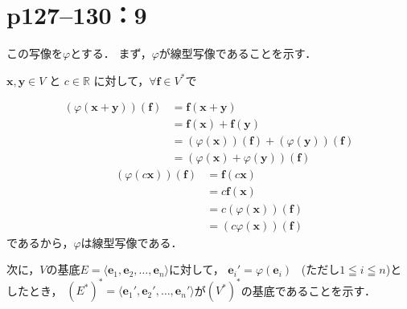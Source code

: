 \section*{p127--130：9}
\begin{tproof}
  この写像を$\varphi$とする．
  まず，$\varphi$が線型写像であることを示す．

  $\bm{x} , \bm{y} \in V$ と $c \in \mathbb{R}$ に対して，$ \forall \bm{f} \in V^\ast$で

  \begin{align*}
    ( \varphi(\bm{x}+\bm{y})) (\bm{f}) & = \bm{f} (\bm{x}+\bm{y})                                  \\
                                       & =\bm{f} (\bm{x}) + \bm{f} (\bm{y})                        \\
                                       & = (\varphi(\bm{x})) (\bm{f}) + (\varphi(\bm{y})) (\bm{f}) \\
                                       & = ( \varphi(\bm{x}) + \varphi(\bm{y})) (\bm{f})
  \end{align*}
  \begin{align*}
    ( \varphi(c \bm{x})) (\bm{f}) & = \bm{f} (c \bm{x})            \\
                                  & = c \bm{f} (\bm{x})            \\
                                  & = c (\varphi(\bm{x})) (\bm{f}) \\
                                  & = (c \varphi(\bm{x})) (\bm{f})
  \end{align*}
  であるから，$\varphi$は線型写像である．

  次に，$V$の基底$E= \langle \bm{e}_1 , \bm{e}_2, \dots , \bm{e}_n \rangle$に対して，
  $\bm{e}_i ' = \varphi ( \bm{e}_i)$ ~(ただし$1 \leqq i \leqq n$)としたとき，
  $(E^\ast )^\ast= \langle \bm{e}_1 ' , \bm{e}_2 ' , \dots , \bm{e}_n ' \rangle$が$(V^\ast)^\ast$の基底であることを示す．


\end{tproof}
